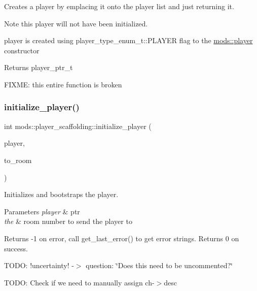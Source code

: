 Creates a player by emplacing it onto the player list and just returning it. \begin{DoxyNote}{Note}
this player will not have been initialized. 

player is created using player\+\_\+type\+\_\+enum\+\_\+t\+::\+P\+L\+A\+Y\+ER flag to the \hyperlink{classmods_1_1player}{mods\+::player} constructor 
\end{DoxyNote}
\begin{DoxyReturn}{Returns}
player\+\_\+ptr\+\_\+t 
\end{DoxyReturn}
F\+I\+X\+ME\+: this entire function is broken \mbox{\label{structmods_1_1player__scaffolding_a5338073bc0cbf880db342e8a5d2c99bb}} 
\subsubsection{\texorpdfstring{initialize\+\_\+player()}{initialize\_player()}}
{\footnotesize\ttfamily int mods\+::player\+\_\+scaffolding\+::initialize\+\_\+player (\begin{DoxyParamCaption}\item[{player\+\_\+ptr\+\_\+t}]{player,  }\item[{int}]{to\+\_\+room }\end{DoxyParamCaption})}

Initializes and bootstraps the player. 
\begin{DoxyParams}{Parameters}
{\em player} & ptr \\
\hline
{\em the} & room number to send the player to \\
\hline
\end{DoxyParams}
\begin{DoxyReturn}{Returns}
-\/1 on error, call get\+\_\+last\+\_\+error() to get error strings. Returns 0 on success. 
\end{DoxyReturn}
T\+O\+DO\+: !uncertainty! -\/$>$ question\+: \char`\"{}\+Does this need to be uncommented?\char`\"{}

T\+O\+DO\+: Check if we need to manually assign ch-\/$>$desc \mbox{\label{structmods_1_1player__scaffolding_ab83785facbe8d207e1bb5e8b8e2b0308}} 
